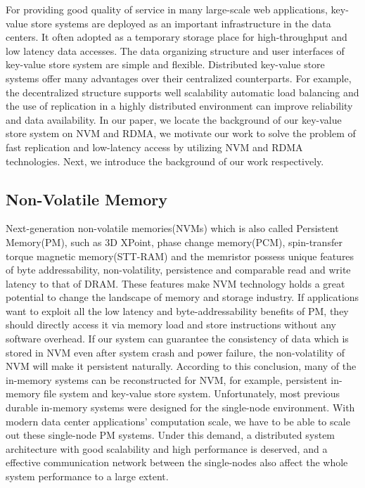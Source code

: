 \documentclass[format=acmsmall, review=false, screen=true]{acmart}
\begin{document}
	For providing good quality of service in many large-scale web applications, key-value store systems are deployed as an important infrastructure in the data centers. It often adopted as a temporary storage place for high-throughput and low latency data accesses. The data organizing structure and user interfaces of key-value store system are simple and flexible. Distributed key-value store systems offer many advantages over their centralized counterparts. For example, the decentralized structure supports well scalability automatic load balancing and the use of replication in a highly distributed environment can improve reliability and data availability. In our paper, we locate the background of our key-value store system on NVM and RDMA, we motivate our work to solve the problem of fast replication and low-latency access by utilizing NVM and RDMA technologies. Next, we introduce the background of our work respectively.
	 	
\subsection{Non-Volatile Memory}
	
	Next-generation non-volatile memories(NVMs) which is also called Persistent Memory(PM), such as 3D XPoint\cite{3dxpoint}, phase change memory(PCM)\cite{Wong2010Phase}, spin-transfer torque magnetic memory(STT-RAM)\cite{Wang2013Low} and the memristor\cite{Zangeneh2014Design} possess unique features of byte addressability, non-volatility, persistence and comparable read and write latency to that of DRAM. These features make NVM technology holds a great potential to change the landscape of memory and storage industry. If applications want to exploit all the low latency and byte-addressability benefits of PM, they should directly access it via memory load and store instructions without any software overhead. If our system can guarantee the consistency of data which is stored in NVM even after system crash and power failure, the non-volatility of NVM will make it persistent naturally. According to this conclusion, many of the in-memory systems can be reconstructed for NVM, for example, persistent in-memory file system and key-value store system. Unfortunately, most previous durable in-memory systems were designed for the single-node environment. With modern data center applications' computation scale, we have to be able to scale out these single-node PM systems. Under this demand, a distributed system architecture with good scalability and high performance is deserved, and a effective communication network between the single-nodes also affect the whole system performance to a large extent.
	
\end{document}
